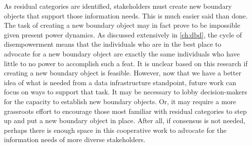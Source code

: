 As residual categories are identified, stakeholders must create new boundary objects that support those information needs. This is much easier said than done. The task of creating a new boundary object may in fact prove to be impossible given present power dynamics. As discussed extensively in \autoref{ch:dbd}, the cycle of disempowerment means that the individuals who are in the best place to advocate for a new boundary object are exactly the same individuals who have little to no power to accomplish such a feat. It is unclear based on this research if creating a new boundary object is feasible. However, now that we have a better idea of what is needed from a data infrastructure standpoint, future work can focus on ways to support that task. It may be necessary to lobby decision-makers for the capacity to establish new boundary objects. Or, it may require a more grassroots effort to encourage those most familiar with residual categories to step up and put a new boundary object in place. After all, if consensus is not needed, perhaps there is enough space in this cooperative work to advocate for the information needs of more diverse stakeholders.